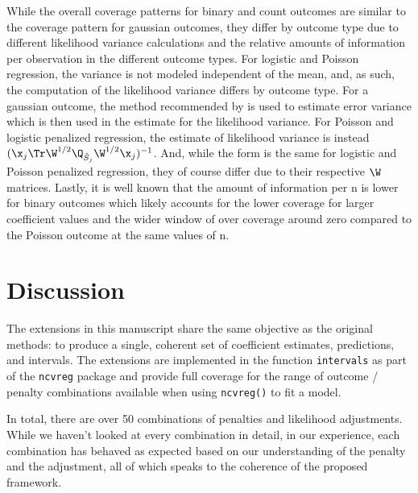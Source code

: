 While the overall coverage patterns for binary and count outcomes are similar to the coverage pattern for gaussian outcomes, they differ by outcome type due to different likelihood variance calculations and the relative amounts of information per observation in the different outcome types. For logistic and Poisson regression, the variance is not modeled independent of the mean, and, as such, the computation of the likelihood variance differs by outcome type. For a gaussian outcome, the method recommended by \cite{Reid2016} is used to estimate error variance which is then used in the estimate for the likelihood variance. For Poisson and logistic penalized regression, the estimate of likelihood variance is instead $(\x_j \Tr \W^{1/2} \Q_{\hat{S}_j} \W^{1/2}\x_j)^{-1}$. And, while the form is the same for logistic and Poisson penalized regression, they of course differ due to their respective $\W$ matrices. Lastly, it is well known that the amount of information per n is lower for binary outcomes which likely accounts for the lower coverage for larger coefficient values and the wider window of over coverage around zero compared to the Poisson outcome at the same values of n.

\section{Discussion}

The extensions in this manuscript share the same objective as the original methods: to produce a single, coherent set of coefficient estimates, predictions, and intervals. The extensions are implemented in the function \texttt{intervals} as part of the \texttt{ncvreg} package and provide full coverage for the range of outcome / penalty combinations available when using \texttt{ncvreg()} to fit a model.

In total, there are over 50 combinations of penalties and likelihood adjustments. While we haven't looked at every combination in detail, in our experience, each combination has behaved as expected based on our understanding of the penalty and the adjustment, all of which speaks to the coherence of the proposed framework.

\newpage

